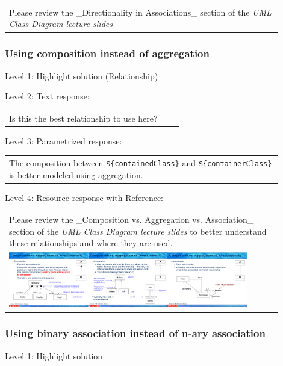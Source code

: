 \begin{tabular}{|p{0.9\linewidth}}
Please review the _Directionality in Associations_ section of the \textit{UML Class Diagram lecture slides}
\end{tabular} \medskip


\subsubsection{Using composition instead of aggregation}

\noindent Level 1: Highlight solution (Relationship) \medskip

\noindent Level 2: Text response: \medskip

\begin{tabular}{|p{0.9\linewidth}}
Is this the best relationship to use here?
\end{tabular} \medskip

\noindent Level 3: Parametrized response: \medskip

\begin{tabular}{|p{0.9\linewidth}}
The composition between \verb|${containedClass}| and \verb|${containerClass}| is better modeled using aggregation.
\end{tabular} \medskip

\noindent Level 4: Resource response with Reference: \medskip

\begin{tabular}{|p{0.9\linewidth}}
Please review the _Composition vs. Aggregation vs. Association_ section of 
the \textit{UML Class Diagram lecture slides} to 
better understand these relationships and where they are used.

\\
\includegraphics[width=0.9\textwidth]{images/composition_aggregation_association.png}
\end{tabular} \medskip


\subsubsection{Using binary association instead of n-ary association}

\noindent Level 1: Highlight solution  \medskip

